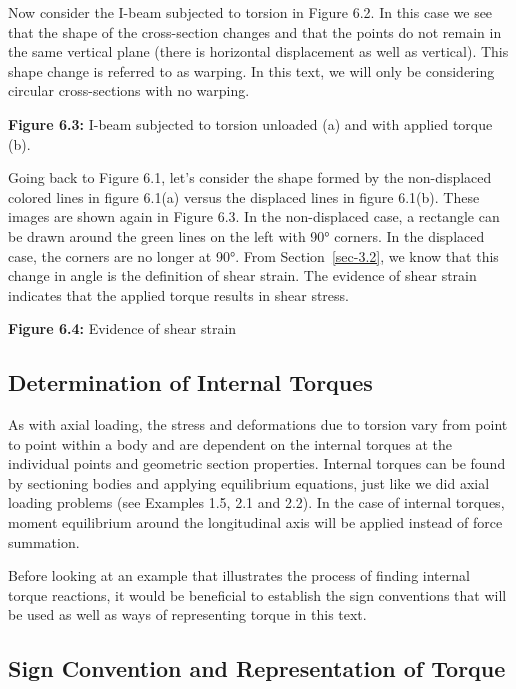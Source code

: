 \documentclass[
  letterpaper,
  DIV=11,
  numbers=noendperiod]{scrreprt}
\theoremstyle{definition}
\theoremstyle{remark}
\begin{document}
Now consider the I-beam subjected to torsion in Figure 6.2. In this case
we see that the shape of the cross-section changes and that the points
do not remain in the same vertical plane (there is horizontal
displacement as well as vertical). This shape change is referred to as
warping. In this text, we will only be considering circular
cross-sections with no warping.

\textbf{Figure 6.3:} I-beam subjected to torsion unloaded (a) and with
applied torque (b).

Going back to Figure 6.1, let's consider the shape formed by the
non-displaced colored lines in figure 6.1(a) versus the displaced lines
in figure 6.1(b). These images are shown again in Figure 6.3. In the
non-displaced case, a rectangle can be drawn around the green lines on
the left with 90° corners. In the displaced case, the corners are no
longer at 90°. From Section~\ref{sec-3.2}, we know that this change in
angle is the definition of shear strain. The evidence of shear strain
indicates that the applied torque results in shear stress.

\textbf{Figure 6.4:} Evidence of shear strain

\subsection{Determination of Internal
Torques}\label{determination-of-internal-torques}

As with axial loading, the stress and deformations due to torsion vary
from point to point within a body and are dependent on the internal
torques at the individual points and geometric section properties.
Internal torques can be found by sectioning bodies and applying
equilibrium equations, just like we did axial loading problems (see
Examples 1.5, 2.1 and 2.2). In the case of internal torques, moment
equilibrium around the longitudinal axis will be applied instead of
force summation.

Before looking at an example that illustrates the process of finding
internal torque reactions, it would be beneficial to establish the sign
conventions that will be used as well as ways of representing torque in
this text.

\subsection{Sign Convention and Representation of
Torque}\label{sign-convention-and-representation-of-torque}
\end{document}
